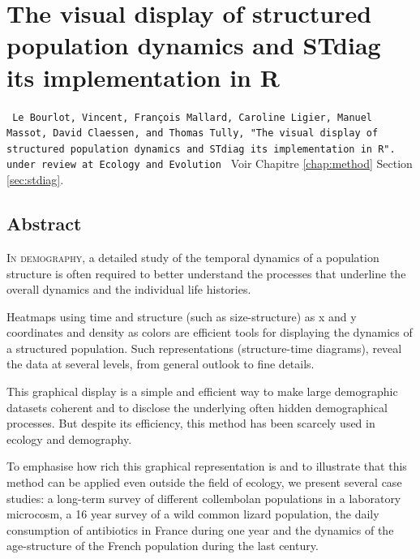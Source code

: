 \chapter{The visual display of structured population dynamics and STdiag its implementation in R}\label{Chap:STDiag}
\vspace{4cm}

\begin{Spacing}{1}
\texttt{
Le Bourlot, Vincent, François Mallard, Caroline Ligier, Manuel Massot, 
David Claessen, and Thomas Tully, "The visual display of structured population dynamics and STdiag its implementation in R".\\
under review at Ecology and Evolution
}
Voir Chapitre \ref{chap:method} Section \ref{sec:stdiag}.
\end{Spacing}

\section*{Abstract}

  
\lettrine[lines=3]{I}{n demography}, a detailed study of the temporal dynamics
of a population structure is often required to better understand the processes
that underline the overall dynamics and the individual life histories.

Heatmaps using time and structure (such as size-structure) as x and y
coordinates and density as colors are efficient tools for displaying the
dynamics of a structured population. Such representations (structure-time
diagrams), reveal the data at several levels, from general outlook to fine
details.

This graphical display is a simple and efficient way to make large demographic
datasets coherent and to disclose the underlying often hidden demographical
processes. But despite its efficiency, this method has been scarcely used in
ecology and demography.

To emphasise how rich this graphical representation is and to illustrate that
this method can be applied even outside the field of ecology, we present several
case studies: a long-term survey of different collembolan populations in a
laboratory microcosm, a 16 year survey of a wild common lizard population, the
daily consumption of antibiotics in France during one year and the dynamics of
the age-structure of the French population during the last century.

